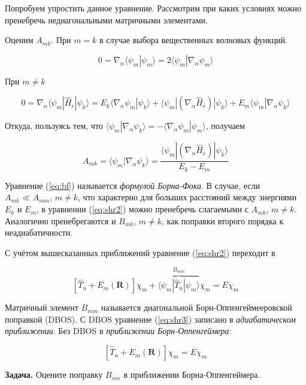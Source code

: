 \documentclass[12pt, oneside]{article}
\numberwithin{equation}{section}  %
\begin{document}
Попробуем упростить данное уравнение. Рассмотрим при каких условиях можно пренебречь недиагональными матричными элементами.

Оценим \(A_{mk}\). При \(m = k\) в случае выбора вещественных волновых функций.

\[0 = \nabla_\alpha \langle \psi_m | \psi_m \rangle = 2 \langle \psi_m | \nabla_\alpha \psi_m \rangle\]

При \(m \neq k\)

\[0 = \nabla_\alpha \langle \psi_m | \hat{H}_e| \psi_k \rangle = E_k \langle \nabla_\alpha \psi_m | \psi_k \rangle + \langle \psi_m | (\nabla_\alpha \hat{H}_e) | \psi_k \rangle + E_m \langle \psi_m | \nabla_\alpha \psi_k \rangle \]

Откуда, пользуясь тем, что \(\langle \psi_m | \nabla_\alpha \psi_k \rangle = - \langle \nabla_\alpha \psi_m | \psi_m \rangle\), получаем

\begin{equation}
    A_{mk} = \langle \psi_m | \nabla_\alpha \psi_k \rangle = \dfrac{\langle \psi_m | (\nabla_\alpha \hat{H}_e )| \psi_k \rangle}{E_k - E_m}
    \label{eq:bf}
\end{equation}

Уравнение (\ref{eq:bf}) называется \textit{формулой Борна-Фока}. В случае, если \(A_{mk} \ll A_{mm}\), \(m \neq k\), что характерно для больших расстояний между энергиями \(E_k\) и \(E_m\), в уравнении (\ref{eq:shr2}) можно пренебречь слагаемыми с \(A_{mk}\), \(m \neq k\). Аналогично пренебрегаются и \(B_{mk}\), \(m \neq k\), как поправки второго порядка к неадиабатичности.

С учётом вышесказанных приближений уравнение (\ref{eq:shr2}) переходит в

\begin{equation}
    \left[ \hat{T}_n + E_m (\bm{R}) \right] \chi_m + \overbrace{\langle \psi_m | \hat{T}_n | \psi_m \rangle}^{B_{mm}} \chi_m = E \chi_m
    \label{eq:shr3}
\end{equation}

Матричный элемент \(B_{mm}\) называется диагональной Борн-Оппенгеймееровской поправкой (DBOS).
С DBOS уравнение (\ref{eq:shr3}) записано в \textit{адиабатическом приближении}. Без DBOS в \textit{приближении Борн-Оппенгеймера}:

\begin{equation}
    \left[ \hat{T}_n + E_m (\bm{R}) \right] \chi_m = E \chi_m
\end{equation}

\textbf{Задача.} Оцените поправку \(B_{mn}\) в приближении Борна-Оппенгеймера.
\end{document}
